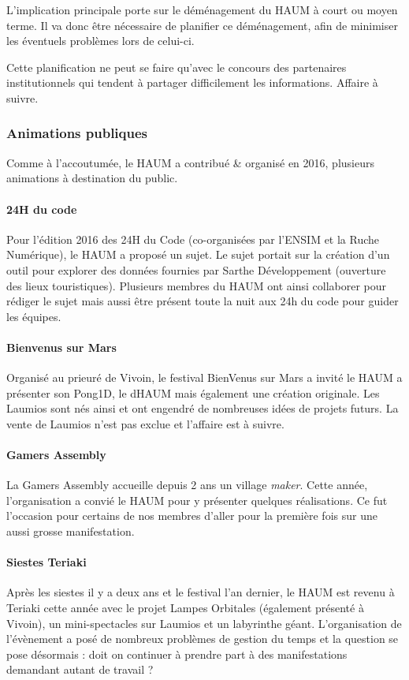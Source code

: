 \documentclass[11pt]{article}
\begin{document}
L'implication principale porte sur le déménagement du HAUM à court ou moyen terme. Il va donc être nécessaire de planifier ce déménagement, afin de minimiser les éventuels problèmes lors de celui-ci.

Cette planification ne peut se faire qu'avec le concours des partenaires institutionnels qui tendent à partager difficilement les informations. Affaire à suivre.

\subsubsection{Animations publiques}

Comme à l'accoutumée, le HAUM a contribué \& organisé en 2016, plusieurs animations à destination du public.

\paragraph{24H du code} Pour l'édition 2016 des 24H du Code (co-organisées par l'ENSIM et la Ruche Numérique), le HAUM a proposé un sujet. Le sujet portait sur la création d'un outil pour explorer des données fournies par Sarthe Développement (ouverture des lieux touristiques). Plusieurs membres du HAUM ont ainsi collaborer pour rédiger le sujet mais aussi être présent toute la nuit aux 24h du code pour guider les équipes.

\paragraph{Bienvenus sur Mars} Organisé au prieuré de Vivoin, le festival BienVenus sur Mars a invité le HAUM a présenter son Pong1D, le dHAUM mais également une création originale. Les Laumios sont nés ainsi et ont engendré de nombreuses idées de projets futurs. La vente de Laumios n'est pas exclue et l'affaire est à suivre.

\paragraph{Gamers Assembly} La Gamers Assembly accueille depuis 2 ans un village \textit{maker}. Cette année, l'organisation a convié le HAUM pour y présenter quelques réalisations. Ce fut l'occasion pour certains de nos membres d'aller pour la première fois sur une aussi grosse manifestation.

\paragraph{Siestes Teriaki} Après les siestes il y a deux ans et le festival l'an dernier, le HAUM est revenu à Teriaki cette année avec le projet Lampes Orbitales (également présenté à Vivoin), un mini-spectacles sur Laumios et un labyrinthe géant. L'organisation de l'évènement a posé de nombreux problèmes de gestion du temps et la question se pose désormais : doit on continuer à prendre part à des manifestations demandant autant de travail ?
\end{document}

